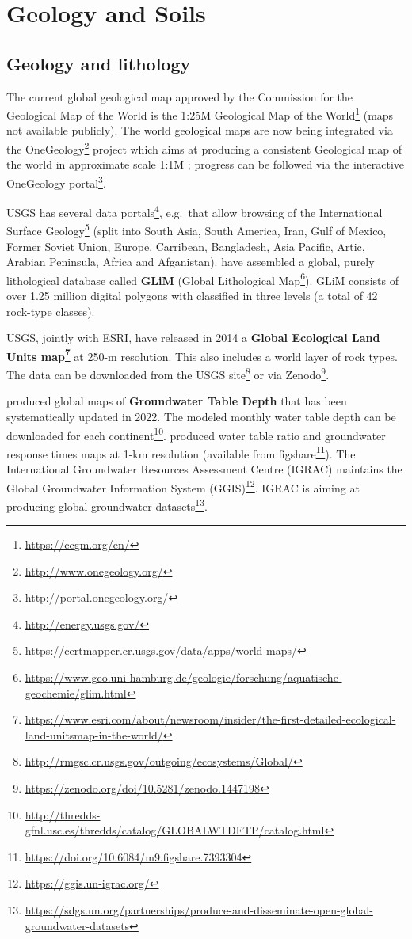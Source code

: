 \documentclass[
  graybox,natbib,nospthms]{svmono}
\renewcommand{\href}[2]{#2 (\url{#1})}
\renewcommand{\href}[2]{#2\footnote{\url{#1}}}
\begin{document}
\hypertarget{geology-and-soils}{%
\section{Geology and Soils}\label{geology-and-soils}}

\hypertarget{geology-and-lithology}{%
\subsection{Geology and lithology}\label{geology-and-lithology}}

The current global geological map approved by the Commission for the Geological Map of
the World is the \href{https://ccgm.org/en/}{1:25M Geological Map of the World} (maps not available publicly).
The world geological maps are now being integrated via the \href{http://www.onegeology.org/}{OneGeology}
project which aims at producing a consistent Geological map of the world in approximate scale 1:1M \citep{jackson2010onegeology};
progress can be followed via the interactive \href{http://portal.onegeology.org/}{OneGeology portal}.

USGS has several \href{http://energy.usgs.gov/}{data portals}, e.g.~that allow browsing
of the \href{https://certmapper.cr.usgs.gov/data/apps/world-maps/}{International Surface Geology}
(split into South Asia, South America, Iran, Gulf of Mexico, Former Soviet Union, Europe, Carribean, Bangladesh, Asia Pacific, Artic, Arabian Peninsula, Africa and Afganistan).
\citet{hartmann2012new} have assembled a global, purely lithological database called \textbf{GLiM} (\href{https://www.geo.uni-hamburg.de/geologie/forschung/aquatische-geochemie/glim.html}{Global Lithological Map}).
GLiM consists of over 1.25 million digital polygons with classified in three levels (a total of 42 rock-type classes).

USGS, jointly with ESRI, have released in 2014 a \textbf{\href{https://www.esri.com/about/newsroom/insider/the-first-detailed-ecological-land-unitsmap-in-the-world/}{Global Ecological Land Units map}}
at 250-m resolution. This also includes a world layer of rock types. The data can
be downloaded from the \href{http://rmgsc.cr.usgs.gov/outgoing/ecosystems/Global/}{USGS site} or via \href{https://zenodo.org/doi/10.5281/zenodo.1447198}{Zenodo}.

\citet{fan2013global} produced global maps of \textbf{Groundwater Table Depth} that has been systematically updated in 2022.
The modeled monthly water table depth can be \href{http://thredds-gfnl.usc.es/thredds/catalog/GLOBALWTDFTP/catalog.html}{downloaded for each continent}.
\citet{cuthbert2019global} produced water table ratio and groundwater response times maps at 1-km resolution (available from \href{https://doi.org/10.6084/m9.figshare.7393304}{figshare}).
The International Groundwater Resources Assessment Centre (IGRAC) maintains the
\href{https://ggis.un-igrac.org/}{Global Groundwater Information System (GGIS)}. IGRAC is
aiming at producing \href{https://sdgs.un.org/partnerships/produce-and-disseminate-open-global-groundwater-datasets}{global groundwater datasets}.
\end{document}
